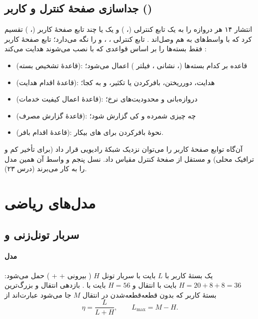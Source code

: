 \documentclass[11pt,a4paper]{article}
\begin{document}
\subsection{جداسازی صفحهٔ کنترل و کاربر ()}
انتشار ۱۴ هر دروازه را به یک تابع کنترلی (، ) و یک یا چند تابع صفحهٔ کاربر (، )
تقسیم کرد که با واسط‌های  به هم وصل‌اند \cite{ts23214}. تابع کنترلی ، ،  و  را نگه
می‌دارد؛ تابع صفحهٔ کاربر فقط بسته‌ها را بر اساس قواعدی که با  نصب می‌شوند هدایت می‌کند \cite{ts29244}:
\begin{itemize}
  \item \textbf{} (قاعدهٔ تشخیص بسته): قاعده بر کدام بسته‌ها (، نشانی ، فیلتر ) اعمال می‌شود؛
  \item \textbf{} (قاعدهٔ اقدام هدایت): هدایت، دورریختن، بافرکردن یا تکثیر، و به کجا؛
  \item \textbf{} (قاعدهٔ اعمال کیفیت خدمات): دروازه‌بانی و محدودیت‌های نرخ؛
  \item \textbf{} (قاعدهٔ گزارش مصرف): چه چیزی شمرده و کی گزارش شود؛
  \item \textbf{} (قاعدهٔ اقدام بافر): نحوهٔ بافرکردن برای های بیکار.
\end{itemize}
آن‌گاه توابع صفحهٔ کاربر را می‌توان نزدیک شبکهٔ رادیویی قرار داد (برای تأخیر کم و ترافیک محلی) و مستقل از صفحهٔ کنترل
مقیاس داد.  نسل پنجم و واسط  آن همین مدل را به کار می‌برند (درس ۲۳).

\section{مدل‌های ریاضی}

\subsection{سربار تونل‌زنی و }\label{sec:gtp}
\paragraph{مدل} یک بستهٔ کاربر با $L$ بایت با سربار تونل $H$ ( بیرونی +  + ) حمل می‌شود:
$H = 20+8+8 = 36$ بایت با انتقال  و $H = 56$ بایت با . بازدهی انتقال و بزرگ‌ترین بستهٔ کاربر که بدون
قطعه‌قطعه‌شدن در  انتقال $M$ جا می‌شود عبارت‌اند از
\begin{equation}\label{eq:gtpeff}
  \eta = \frac{L}{L+H}, \qquad L_{\max} = M - H .
\end{equation}
\end{document}
